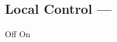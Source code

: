 \subsection[Local Control]{Local Control --- \UiKey{\SET}}









































Off
On

